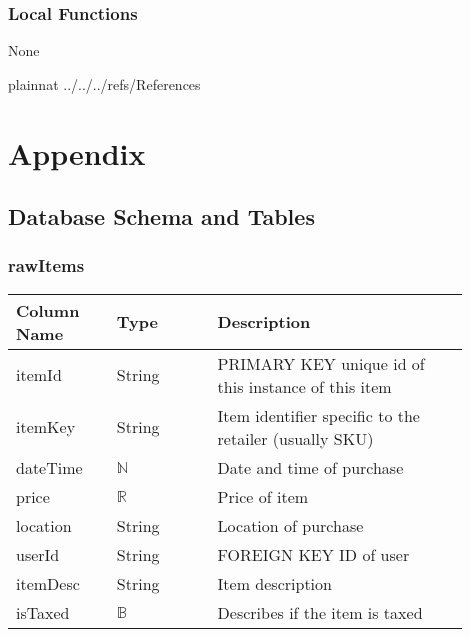 \documentclass[12pt, titlepage]{article}
\begin{document}
\subsubsection{Local Functions}
None

\newpage

 {plainnat}
 {../../../refs/References}

\newpage

\section{Appendix} \label{Appendix}

\subsection{Database Schema and Tables} \label{dbAppendix}

\subsubsection{rawItems}
\begin{table}[H]
  \begin{tabular}{|p{0.2\linewidth}|p{0.2\linewidth}|p{0.5\linewidth}|}
    \hline
    \textbf{Column Name} & \textbf{Type} & \textbf{Description} \\
    \hline
    itemId & String & PRIMARY KEY unique id of this instance of this item \\
    \hline
    itemKey & String & Item identifier specific to the retailer (usually SKU) \\
    \hline
    dateTime & $\mathbb{N}$ & Date and time of purchase \\
    \hline
    price & $\mathbb{R}$ & Price of item \\
    \hline
    location & String & Location of purchase \\
    \hline
    userId & String & FOREIGN KEY ID of user\\
    \hline
    itemDesc & String & Item description\\
    \hline
    isTaxed & $\mathbb{B}$ & Describes if the item is taxed\\
    \hline
  \end{tabular}
\end{table}
\end{document}
